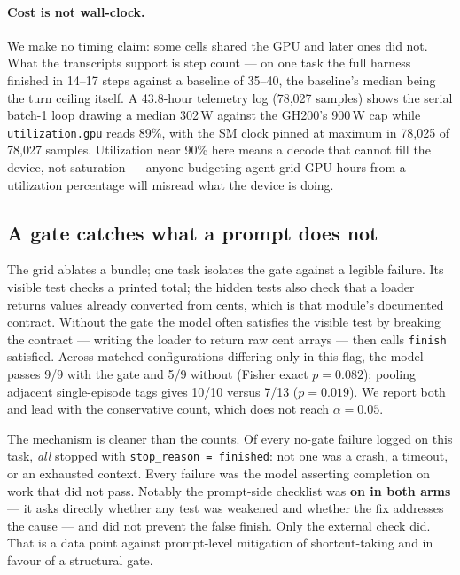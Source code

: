 \documentclass[10pt]{article}
\begin{document}
\paragraph{Cost is not wall-clock.}
We make no timing claim: some cells shared the GPU and later ones did not. What the transcripts
support is step count --- on one task the full harness finished in 14--17 steps against a
baseline of 35--40, the baseline's median being the turn ceiling itself. A 43.8-hour telemetry
log (78{,}027 samples) shows the serial batch-1 loop drawing a median 302\,W against the
GH200's 900\,W cap while \texttt{utilization.gpu} reads 89\%, with the SM clock pinned at
maximum in 78{,}025 of 78{,}027 samples. Utilization near 90\% here means a decode that cannot
fill the device, not saturation --- anyone budgeting agent-grid GPU-hours from a utilization
percentage will misread what the device is doing.

\subsection{A gate catches what a prompt does not}
\label{sec:gate}

The grid ablates a bundle; one task isolates the gate against a legible failure. Its visible
test checks a printed total; the hidden tests also check that a loader returns values already
converted from cents, which is that module's documented contract. Without the gate the model
often satisfies the visible test by breaking the contract --- writing the loader to return raw
cent arrays --- then calls \texttt{finish} satisfied. Across matched configurations differing
only in this flag, the model passes 9/9 with the gate and 5/9 without (Fisher exact
$p = 0.082$); pooling adjacent single-episode tags gives 10/10 versus 7/13 ($p = 0.019$). We
report both and lead with the conservative count, which does not reach $\alpha = 0.05$.

The mechanism is cleaner than the counts. Of every no-gate failure logged on this task,
\emph{all} stopped with \texttt{stop\_reason = finished}: not one was a crash, a timeout, or an
exhausted context. Every failure was the model asserting completion on work that did not pass.
Notably the prompt-side checklist was \textbf{on in both arms} --- it asks directly whether any
test was weakened and whether the fix addresses the cause --- and did not prevent the false
finish. Only the external check did. That is a data point against prompt-level mitigation of
shortcut-taking \citep{everymodel} and in favour of a structural gate.
\end{document}
